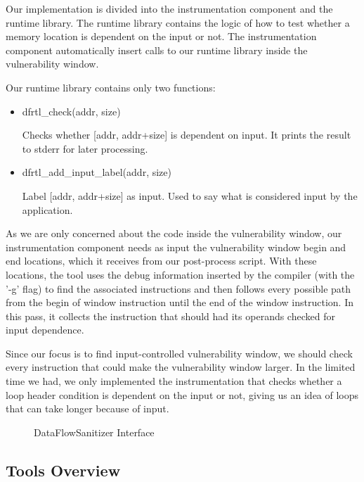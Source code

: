 \documentclass{acm_proc_article-sp}
\begin{document}
Our implementation is divided into the instrumentation component and the runtime library. The runtime library contains the logic of how to test whether a memory location is dependent on the input or not.  The instrumentation component automatically insert calls to our runtime library inside the vulnerability window.

Our runtime library contains only two functions:

\begin{itemize}
        \item dfrtl\_check(addr, size)

Checks whether [addr, addr+size] is dependent on input. It prints the result to stderr for later processing.

\item dfrtl\_add\_input\_label(addr, size)

	Label [addr, addr+size] as input. Used to say what is considered input by the application.

\end{itemize}

	As we are only concerned about the code inside the vulnerability window, our instrumentation component needs as input the vulnerability window begin and end locations, which it receives from our post-process script. With these locations, the tool uses the debug information inserted by the compiler (with the '-g' flag) to find the associated instructions and then follows every possible path from the begin of window instruction until the end of the window instruction. In this pass, it collects the instruction that should had its operands checked for input dependence.

	Since our focus is to find input-controlled vulnerability window, we should check every instruction that could make the vulnerability window larger. In the limited time we had, we only implemented the instrumentation that checks whether a loop header condition is dependent on the input or not, giving us an idea of loops that can take longer because of input.

\begin{figure*}
\centering
{}
\caption{DataFlowSanitizer Interface}
\label{fig:dataFlowInterface}
\end{figure*}

\subsection{Tools Overview}
\end{document}
